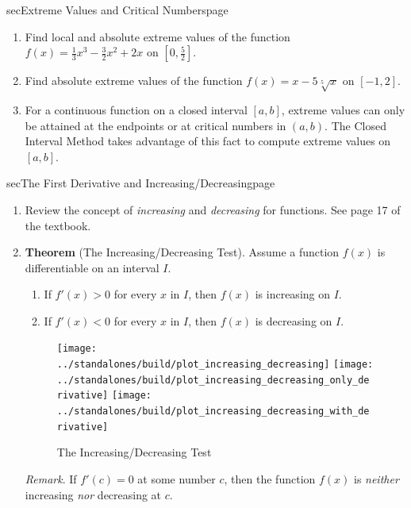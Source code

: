 \documentclass[../main]{subfiles}
\begin{document}
\begin{outline}{sec}{Extreme Values and Critical Numbers}{page}
\begin{enumerate}
     
   \item Find local and absolute extreme values of the function \(f(x) = \frac{1}{3} x^3 - \frac{3}{2} x^2 + 2x\) on  \([0, \frac{5}{2} ]\).
   \item Find absolute extreme values of the function \(f(x) = x - 5\sqrt[5]{x}\) on \([-1,2]\).
   \item {For a continuous function on a closed interval \([a,b]\), extreme values can only be attained at the endpoints or at critical numbers in \((a,b)\). The Closed Interval Method takes advantage of this fact to compute extreme values on \([a,b]\).}
   \end{enumerate}
\end{outline}



\begin{outline}{sec}{The First Derivative and Increasing/Decreasing}{page}\label{outline:app_first_derivative}
  \begin{enumerate}
    \item Review the concept of \emph{increasing} and \emph{decreasing} for functions. See page 17 of the textbook.       
    \item \textbf{Theorem} (The Increasing/Decreasing Test). Assume a function \(f(x)\) is differentiable on an interval \(I\).
      \begin{mdframed}[style=simple]
        \begin{enumerate}[label=(\alph*)]
          \item If \(f'(x) > 0\) for every \(x\) in \(I\), then \(f(x)\) is increasing on \(I\).
          \item If \(f'(x) < 0\) for every \(x\) in \(I\), then \(f(x)\) is decreasing on \(I\).
        \end{enumerate}
      \end{mdframed}
         
      \begin{figure}[h]
        \texttt{[image: ../standalones/build/plot\_increasing\_decreasing]}
        \quad
        \texttt{[image: ../standalones/build/plot\_increasing\_decreasing\_only\_derivative]}
        \quad
        \texttt{[image: ../standalones/build/plot\_increasing\_decreasing\_with\_derivative]}

        \caption{The Increasing/Decreasing Test}
        \label{fig:increasing_decreasing_test}
      \end{figure}
      \textit{Remark}. If \(f'(c) = 0\) at some number \(c\), then the function \(f(x)\) is \emph{neither} increasing \emph{nor} decreasing at \(c\).


\end{enumerate}
\end{outline}
\end{document}
